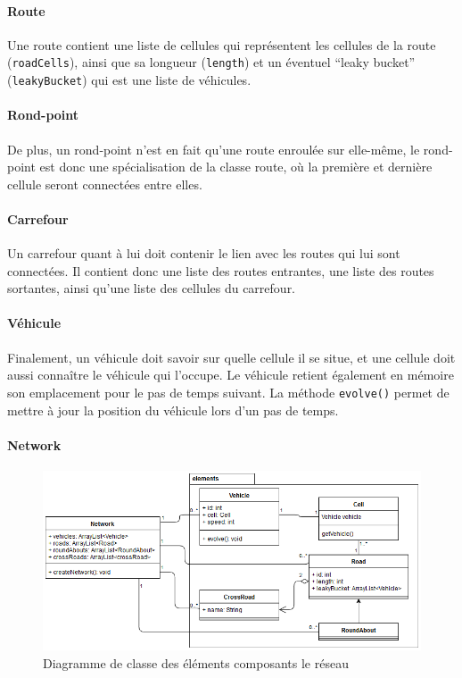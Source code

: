 \documentclass[a4paper,11pt, titlepage]{extarticle}
\begin{document}
\paragraph{Route}

Une route contient une liste de cellules qui représentent les cellules de la route (\texttt{roadCells}), ainsi que sa longueur (\texttt{length}) et un éventuel ``leaky bucket'' (\texttt{leakyBucket}) qui est une liste de véhicules.

\paragraph{Rond-point}

De plus, un rond-point n'est en fait qu'une route enroulée sur elle-même, le rond-point est donc une spécialisation de la classe route, où la première et dernière cellule seront connectées entre elles.

\paragraph{Carrefour}

Un carrefour quant à lui doit contenir le lien avec les routes qui lui sont connectées. Il contient donc une liste des routes entrantes, une liste des routes sortantes, ainsi qu'une liste des cellules du carrefour.

\paragraph{Véhicule}

Finalement, un véhicule doit savoir sur quelle cellule il se situe, et une cellule doit aussi connaître le véhicule qui l'occupe. Le véhicule retient également en mémoire son emplacement pour le pas de temps suivant. La méthode \texttt{evolve()} permet de mettre à jour la position du véhicule lors d'un pas de temps.

\paragraph{Network}

\begin{figure}[!h]
\begin{center}
\includegraphics[width=16cm]{elements_diagram.png}
\caption{Diagramme de classe des éléments composants le réseau}
\label{imgElements}
\end{center}
\end{figure}
\end{document}
